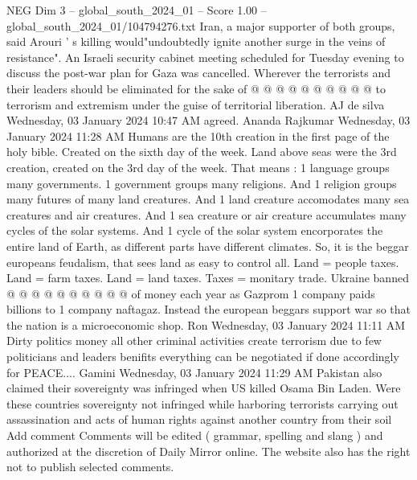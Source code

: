 \begin{textsample}{NEG Dim 3 – global\_south\_2024\_01 – Score 1.00 – global\_south\_2024\_01/104794276.txt}
Iran, a major supporter of both groups, said Arouri ' s killing would"undoubtedly ignite another surge in the veins of resistance".
An Israeli security cabinet meeting scheduled for Tuesday evening to discuss the post-war plan for Gaza was cancelled.
Wherever the terrorists and their leaders should be eliminated for the sake of @ @ @ @ @ @ @ @ @ @ to terrorism and extremism under the guise of territorial liberation.
AJ de silva Wednesday, 03 January 2024 10:47 AM agreed.
Ananda Rajkumar Wednesday, 03 January 2024 11:28 AM Humans are the 10th creation in the first page of the holy bible.
Created on the sixth day of the week.
Land above seas were the 3rd creation, created on the 3rd day of the week.
That means : 1 language groups many governments. 1 government groups many religions.
And 1 religion groups many futures of many land creatures.
And 1 land creature accomodates many sea creatures and air creatures.
And 1 sea creature or air creature accumulates many cycles of the solar systems.
And 1 cycle of the solar system encorporates the entire land of Earth, as different parts have different climates.
So, it is the beggar europeans feudalism, that sees land as easy to control all.
Land = people taxes.
Land = farm taxes.
Land = land taxes.
Taxes = monitary trade.
Ukraine banned @ @ @ @ @ @ @ @ @ @ of money each year as Gazprom 1 company paids billions to 1 company naftagaz.
Instead the european beggars support war so that the nation is a microeconomic shop.
Ron Wednesday, 03 January 2024 11:11 AM Dirty politics money all other criminal activities create terrorism due to few politicians and leaders benifits everything can be negotiated if done accordingly for PEACE....
Gamini Wednesday, 03 January 2024 11:29 AM Pakistan also claimed their sovereignty was infringed when US killed Osama Bin Laden.
Were these countries sovereignty not infringed while harboring terrorists carrying out assassination and acts of human rights against another country from their soil Add comment Comments will be edited ( grammar, spelling and slang ) and authorized at the discretion of Daily Mirror online.
The website also has the right not to publish selected comments.

\end{textsample}

